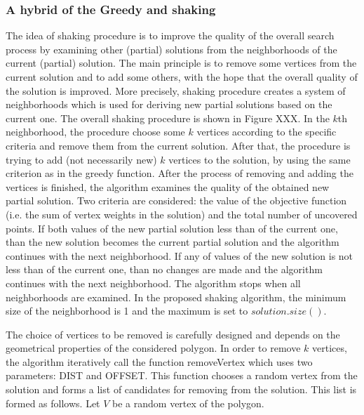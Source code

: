 \documentclass[runningheads,a4paper]{elsarticle}
\begin{document}
	\subsubsection{A hybrid of the Greedy and shaking}
The idea of shaking procedure is to improve the quality of the overall search process by examining other (partial) solutions from the neighborhoods of the current (partial) solution. The main principle  is to remove some vertices from the current solution and to add some others, with the hope that the overall quality of the solution is improved. More precisely,
shaking procedure creates a system of neighborhoods which is used for deriving new partial solutions based on the current one.
 The overall shaking procedure is shown in Figure XXX. In the $k$th neighborhood, the procedure choose some $k$ vertices according to the specific criteria and remove them from the current solution. After that, the procedure is trying to add (not necessarily new) $k$ vertices to the solution, by using the same criterion as in the greedy function. After the process of removing and adding the vertices is finished, the algorithm examines the quality of the obtained new partial solution. Two criteria are considered: the value of the objective function (i.e. the sum of vertex weights in the solution) and the total number of uncovered points. If both values of the new partial solution less than of the current one, than the new solution becomes the current partial solution and the algorithm continues with the next neighborhood. If any of values of the new solution is not less than of the current one, than no changes are made and the algorithm continues with the next neighborhood. The algorithm stops when all neighborhoods are examined. In the proposed shaking algorithm, the minimum size of the neighborhood is 1 and the maximum is set to $solution.size()$.

The choice of vertices to be removed is carefully designed and depends on the geometrical properties of the considered polygon. In order to remove $k$ vertices, the algorithm iteratively call the function removeVertex which uses two parameters: DIST and OFFSET. This function chooses a random vertex from the solution and forms a list of candidates for removing from the solution. This list is formed as follows. Let $V$ be a random vertex of the polygon.

	
	
	
\end{document}
